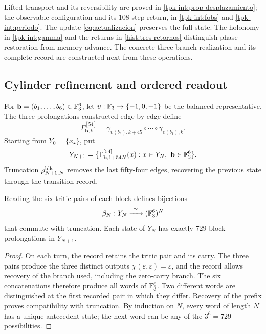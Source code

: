 Lifted transport and its reversibility are proved in \ref{tpk-int:prop-desplazamiento}; the observable configuration and its $108$-step return, in \ref{tpk-int:fobs} and \ref{tpk-int:periodo}. The update \eqref{eq:actualizacion} preserves the full state. The holonomy in \ref{tpk-int:gamma} and the returns in \ref{hist:tres-retornos} distinguish phase restoration from memory advance. The concrete three-branch realization and its complete record are constructed next from these operations.



\subsection{Cylinder refinement and ordered readout}
\label{hmtfg:refinamiento-ordenado}

For \(\mathbf b=(b_1,\ldots,b_6)\in\mathbb F_3^6\), let
\(\upsilon:\mathbb F_3\to\{-1,0,+1\}\) be the balanced representative. The three prolongations constructed edge by edge define
\[
 \Gamma^{[54]}_{\mathbf b,k}
 =\gamma_{\upsilon(b_6),k+45}\circ\cdots\circ
   \gamma_{\upsilon(b_1),k}.
\]
Starting from \(Y_0=\{x_\star\}\), put
\[
 Y_{N+1}
 =\{\Gamma^{[54]}_{\mathbf b,1+54N}(x):
          x\in Y_N,\ \mathbf b\in\mathbb F_3^6\}.
\]
Truncation \(\rho^{\rm blk}_{N+1,N}\) removes the last fifty-four edges, recovering the previous state through the transition record.

\begin{proposition}
\label{hmtfg:bloques-729}
Reading the six tritic pairs of each block defines bijections
\[
 \beta_N:Y_N\xrightarrow{\ \cong\ }(\FF_3^6)^N
\]
that commute with truncation. Each state of \(Y_N\) has exactly \(729\) block prolongations in \(Y_{N+1}\).
\end{proposition}
\begin{proof}
On each turn, the record retains the tritic pair and its carry. The three pairs produce the three distinct outputs \(\chi(\varepsilon,\varepsilon)=\varepsilon\), and the record allows recovery of the branch used, including the zero-carry branch. The six concatenations therefore produce all words of \(\mathbb F_3^6\). Two different words are distinguished at the first recorded pair in which they differ. Recovery of the prefix proves compatibility with truncation. By induction on \(N\), every word of length \(N\) has a unique antecedent state; the next word can be any of the \(3^6=729\) possibilities.
\end{proof}

